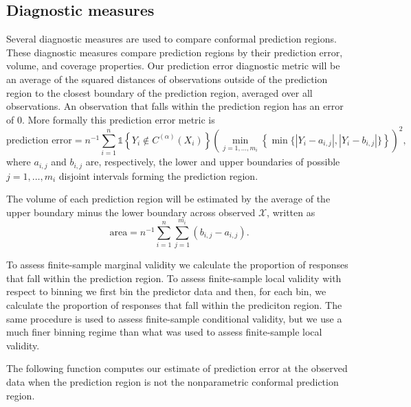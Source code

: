 \documentclass[11pt]{article}\usepackage[]{graphicx}\usepackage[]{color}
\newcommand{\Copt}{C^{(\alpha)}}
\newcommand{\X}{\mathcal{X}}
\newcommand{\indicator}[1]{\mathds{1}\left\{ #1 \right\}}
\begin{document}
\subsection{Diagnostic measures}

Several diagnostic measures are used to compare conformal prediction regions.
These diagnostic measures compare prediction regions by their 
prediction error, volume, and coverage properties.
Our prediction error diagnostic metric will be an average of the squared 
distances of observations outside of the prediction region to the closest 
boundary of the prediction region, averaged over all 
observations. An observation that falls within the prediction region 
has an error of 0.  More formally this prediction error metric is 
$$
  \text{prediction error} 
    = n^{-1}\sum_{i=1}^n\indicator{Y_i \not\in \Copt(X_i)}
      \left(\min_{j=1,\ldots,m_i}\left\{\min\{|Y_i - a_{i,j}|, 
        |Y_i - b_{i,j}|\}\right\}\right)^2,
$$
where $a_{i,j}$ and $b_{i,j}$ are, respectively, the lower and upper 
boundaries of possible $j = 1, \ldots, m_i$ disjoint intervals forming 
the prediction region.  

The volume of each prediction region will be estimated by the average of the 
upper boundary minus the lower boundary across observed $\X$, written as
$$ 
  \text{area} = n^{-1}\sum_{i=1}^n\sum_{j=1}^{m_i}(b_{i,j} - a_{i,j}).
$$


To assess finite-sample marginal validity we calculate the proportion of 
responses that fall within the prediction region.  To assess finite-sample 
local validity with respect to binning we first bin the predictor data and 
then, for each bin, we calculate the proportion of responses that fall 
within the prediciton region. The same procedure is used to assess 
finite-sample conditional validity, but we use a much finer binning regime 
than what was used to assess finite-sample local validity.  

The following function computes our estimate of prediction error at the 
observed data when the prediction region is not the nonparametric 
conformal prediction region.
\end{document}
